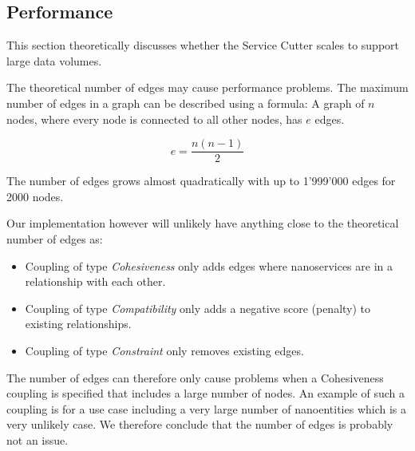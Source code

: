 \subsection{Performance}
\label{app:performance}

This section theoretically discusses whether the Service Cutter scales to support large data volumes.

The theoretical number of edges may cause performance problems. The maximum number of edges in a graph can be described using a formula: A graph of $n$ nodes, where every node is connected to all other nodes, has $e$ edges.

\begin{displaymath}
e = \frac{n(n-1)}{2}
\end{displaymath}

The number of edges grows almost quadratically with up to 1'999'000 edges for 2000 nodes.

Our implementation however will unlikely have anything close to the theoretical number of edges as:
\begin{itemize}
	\item Coupling of type \textit{Cohesiveness} only adds edges where nanoservices are in a relationship with each other.
	\item Coupling of type \textit{Compatibility} only adds a negative score (penalty) to existing relationships.
	\item Coupling of type \textit{Constraint} only removes existing edges.
\end{itemize}

The number of edges can therefore only cause problems when a Cohesiveness coupling is specified that includes a large number of nodes. An example of such a coupling is for a use case including a very large number of nanoentities which is a very unlikely case. We therefore conclude that the number of edges is probably not an issue.
